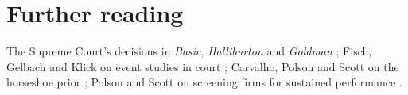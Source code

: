 \section*{Further reading}
The Supreme Court's decisions in \emph{Basic}, \emph{Halliburton} and \emph{Goldman} \citep{basic1988,halliburton2014,goldman2021}; Fisch, Gelbach and Klick on event studies in court \citep{fox2018}; Carvalho, Polson and Scott on the horseshoe prior \citep{carvalho2010}; Polson and Scott on screening firms for sustained performance \citep{polson_scott_lucky}.
